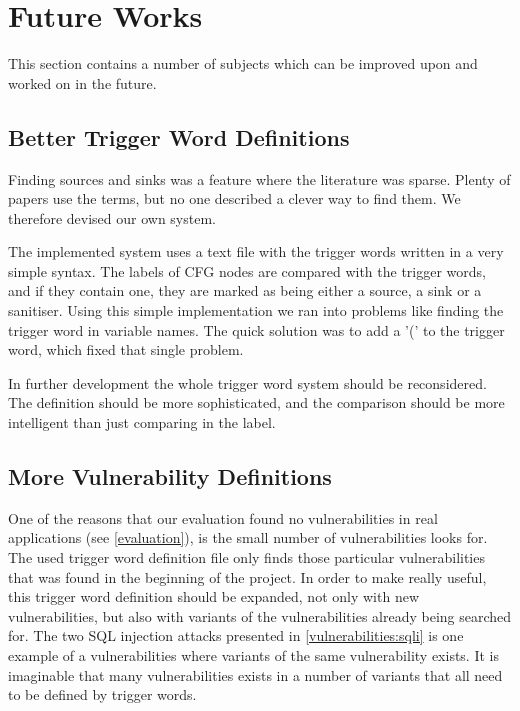 \section{Future Works}
This section contains a number of subjects which can be improved upon and worked on in the future.

\subsection{Better Trigger Word Definitions}
Finding sources and sinks was a feature where the literature was sparse.
Plenty of papers use the terms, but no one described a clever way to find them.
We therefore devised our own system.

The implemented system uses a text file with the trigger words written in a very simple syntax.
The labels of CFG nodes are compared with the trigger words, and if they contain one, they are marked as being either a source, a sink or a sanitiser.
Using this simple implementation we ran into problems like finding the trigger word in variable names.
The quick solution was to add a '(' to the trigger word, which fixed that single problem.

In further development the whole trigger word system should be reconsidered.
The definition should be more sophisticated, and the comparison should be more intelligent than just comparing in the label.

\subsection{More Vulnerability Definitions}
One of the reasons that our evaluation found no vulnerabilities in real applications (see \cref{evaluation}), is the small number of vulnerabilities \pyt{} looks for.
The used trigger word definition file only finds those particular vulnerabilities that was found in the beginning of the project.
In order to make \pyt{} really useful, this trigger word definition should be expanded, not only with new vulnerabilities, but also with variants of the vulnerabilities already being searched for.
The two SQL injection attacks presented in \cref{vulnerabilities:sqli} is one example of a vulnerabilities where variants of the same vulnerability exists.
It is imaginable that many vulnerabilities exists in a number of variants that all need to be defined by trigger words.

